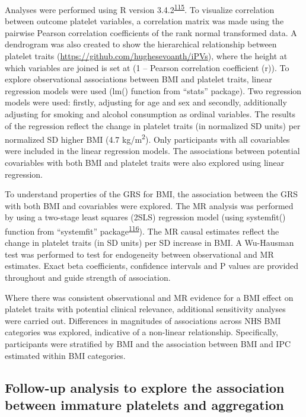 \documentclass[11pt,twoside]{bristolthesis}
\begin{document}
Analyses were performed using R version 3.4.2\textsuperscript{\protect\hyperlink{ref-Team2019a}{115}}. To visualize correlation between outcome platelet variables, a correlation matrix was made using the pairwise Pearson correlation coefficients of the rank normal transformed data. A dendrogram was also created to show the hierarchical relationship between platelet traits (\url{https://github.com/hughesevoanth/iPVs}), where the height at which variables are joined is set at (1 -- Pearson correlation coefficient (r)). To explore observational associations between BMI and platelet traits, linear regression models were used (lm() function from ``stats'' package). Two regression models were used: firstly, adjusting for age and sex and secondly, additionally adjusting for smoking and alcohol consumption as ordinal variables. The results of the regression reflect the change in platelet traits (in normalized SD units) per normalized SD higher BMI (4.7 kg/m\textsuperscript{2}). Only participants with all covariables were included in the linear regression models. The associations between potential covariables with both BMI and platelet traits were also explored using linear regression.

To understand properties of the GRS for BMI, the association between the GRS with both BMI and covariables were explored. The MR analysis was performed by using a two-stage least squares (2SLS) regression model (using systemfit() function from ``systemfit'' package\textsuperscript{\protect\hyperlink{ref-Henningsen2007}{116}}). The MR causal estimates reflect the change in platelet traits (in SD units) per SD increase in BMI. A Wu-Hausman test was performed to test for endogeneity between observational and MR estimates. Exact beta coefficients, confidence intervals and P values are provided throughout and guide strength of association.

Where there was consistent observational and MR evidence for a BMI effect on platelet traits with potential clinical relevance, additional sensitivity analyses were carried out. Differences in magnitudes of associations across NHS BMI categories was explored, indicative of a non-linear relationship. Specifically, participants were stratified by BMI and the association between BMI and IPC estimated within BMI categories.

\hypertarget{follow-up-analysis-to-explore-the-association-between-immature-platelets-and-aggregation}{%
\subsection{Follow-up analysis to explore the association between immature platelets and aggregation}\label{follow-up-analysis-to-explore-the-association-between-immature-platelets-and-aggregation}}
\end{document}
